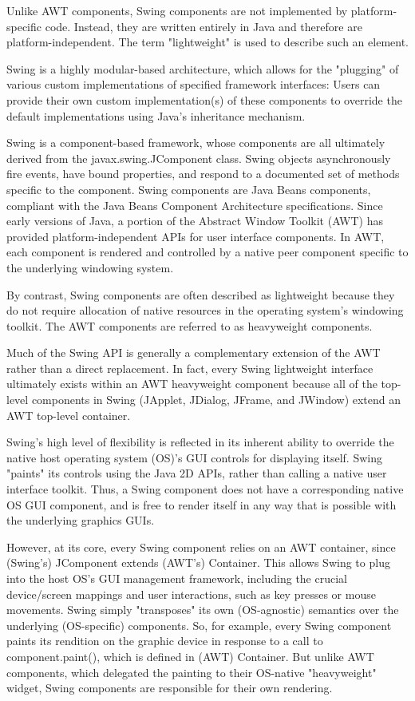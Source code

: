 Unlike AWT components, Swing components are not implemented by platform-specific code. Instead, they are written entirely in Java and therefore are platform-independent. The term "lightweight" is used to describe such an element.

Swing is a highly modular-based architecture, which allows for the "plugging" of various custom implementations of specified framework interfaces: Users can provide their own custom implementation(s) of these components to override the default implementations using Java's inheritance mechanism.

Swing is a component-based framework, whose components are all ultimately derived from the javax.swing.JComponent class. Swing objects asynchronously fire events, have bound properties, and respond to a documented set of methods specific to the component. Swing components are Java Beans components, compliant with the Java Beans Component Architecture specifications.
Since early versions of Java, a portion of the Abstract Window Toolkit (AWT) has provided platform-independent APIs for user interface components. In AWT, each component is rendered and controlled by a native peer component specific to the underlying windowing system.

By contrast, Swing components are often described as lightweight because they do not require allocation of native resources in the operating system's windowing toolkit. The AWT components are referred to as heavyweight components. 

Much of the Swing API is generally a complementary extension of the AWT rather than a direct replacement. In fact, every Swing lightweight interface ultimately exists within an AWT heavyweight component because all of the top-level components in Swing (JApplet, JDialog, JFrame, and JWindow) extend an AWT top-level container.

Swing's high level of flexibility is reflected in its inherent ability to override the native host operating system (OS)'s GUI controls for displaying itself. Swing "paints" its controls using the Java 2D APIs, rather than calling a native user interface toolkit. Thus, a Swing component does not have a corresponding native OS GUI component, and is free to render itself in any way that is possible with the underlying graphics GUIs.

However, at its core, every Swing component relies on an AWT container, since (Swing's) JComponent extends (AWT's) Container. This allows Swing to plug into the host OS's GUI management framework, including the crucial device/screen mappings and user interactions, such as key presses or mouse movements. Swing simply "transposes" its own (OS-agnostic) semantics over the underlying (OS-specific) components. So, for example, every Swing component paints its rendition on the graphic device in response to a call to component.paint(), which is defined in (AWT) Container. But unlike AWT components, which delegated the painting to their OS-native "heavyweight" widget, Swing components are responsible for their own rendering.

